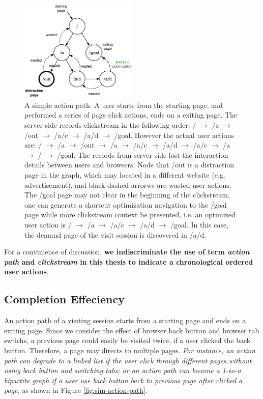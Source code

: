\begin{figure}[H]
    \centering
    \includegraphics[width=0.5\textwidth]{figures/clickstream}
    \caption{A simple action path. A user starts from the starting page, and performed
    a series of page click actions, ends on a exiting page. 
    The server side records clickstream in the following order:
    / $\rightarrow$ /a $\rightarrow$ /out $\rightarrow$ /a/c $\rightarrow$ /a/d $\rightarrow$ /goal.
    However the actual user actions are: 
    / $\rightarrow$ /a $\rightarrow$ /out $\rightarrow$ /a $\rightarrow$ /a/c $\rightarrow$ /a/d 
    $\rightarrow$ /a/c $\rightarrow$ /a $\rightarrow$ / $\rightarrow$ /goal. 
    The records from server side lost the interaction details between users and browsers.
    Node that /out is a distraction page in the graph, 
    which may located in a different website (e.g. advertisement), 
    and black dashed arrorws are wasted user
    actions. The /goal page may not clear in the beginning of the clickstream, one can generate
    a shortcut optimization navigation to the /goal page while more clickstream context
    be presented, i.e. an optimized user action is 
    / $\rightarrow$ /a $\rightarrow$ /a/c $\rightarrow$ /a/d $\rightarrow$ /goal. In this case,
    the demand page of the visit session is discovered in /a/d.}
    \label{fig:clickstream}
\end{figure}

For a convinience of discussion, \textbf{we indiscriminate the use of 
term \emph{action path} and \emph{clickstream} in
this thesis to indicate a chronological ordered user actions}.

\subsection{Completion Effeciency}

An action path of a visiting session starts from a starting page and ends on a exiting page.
Since we consider the effect of browser back button and browser tab swtichs, 
a previous page could easily be visited twice, if a user clicked the back button. 
Therefore, a page may directs to multiple pages. 
\emph{For instance, an action path can degrade to a linked list if the user
click through different pages without using back button and switching tabs; or an action
path can become a 1-to-n bipartite graph if a user use back button back to previous page
after clicked a page,} as shown in Figure \ref{fig:sim-action-path}.

